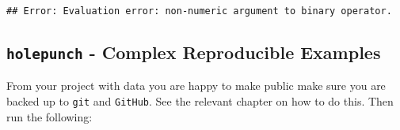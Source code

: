 \documentclass[]{book}
\newenvironment{Shaded}{\begin{snugshade}}{\end{snugshade}}
\newcommand{\CommentTok}[1]{\textcolor[rgb]{0.56,0.35,0.01}{\textit{#1}}}
\newcommand{\DataTypeTok}[1]{\textcolor[rgb]{0.13,0.29,0.53}{#1}}
\newcommand{\DecValTok}[1]{\textcolor[rgb]{0.00,0.00,0.81}{#1}}
\newcommand{\KeywordTok}[1]{\textcolor[rgb]{0.13,0.29,0.53}{\textbf{#1}}}
\newcommand{\NormalTok}[1]{#1}
\newcommand{\OperatorTok}[1]{\textcolor[rgb]{0.81,0.36,0.00}{\textbf{#1}}}
\newcommand{\OtherTok}[1]{\textcolor[rgb]{0.56,0.35,0.01}{#1}}
\newcommand{\StringTok}[1]{\textcolor[rgb]{0.31,0.60,0.02}{#1}}
\begin{document}
\begin{Shaded}
\end{Shaded}

\begin{verbatim}
## Error: Evaluation error: non-numeric argument to binary operator.
\end{verbatim}

\hypertarget{holepunch---complex-reproducible-examples}{%
\subsection{\texorpdfstring{\texttt{holepunch} - Complex Reproducible Examples}{holepunch - Complex Reproducible Examples}}\label{holepunch---complex-reproducible-examples}}

From your project with data you are happy to make public make sure you are backed up to \texttt{git} and \texttt{GitHub}. See the relevant chapter on how to do this. Then run the following:
\end{document}
